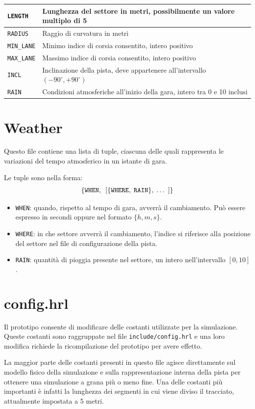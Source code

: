 \documentclass[11pt,a4paper]{report}
\begin{document}
\begin{tabularx}{\textwidth}{|l|X|}
\hline
\texttt{LENGTH} & Lunghezza del settore in metri, possibilmente un valore multiplo di 5\\
\hline
\texttt{RADIUS} & Raggio di curvatura in metri\\
\hline
\texttt{MIN\_LANE} & Minimo indice di corsia consentito, intero positivo\\
\hline
\texttt{MAX\_LANE} & Massimo indice di corsia consentito, intero positivo\\
\hline
\texttt{INCL} & Inclinazione della pista, deve appartenere all'intervallo $(-90^\circ, +90^\circ)$\\
\hline
\texttt{RAIN} & Condizioni atmosferiche all'inizio della gara, intero tra 0 e 10 inclusi\\
\hline
\end{tabularx}

\section*{Weather}
Questo file contiene una lista di tuple, ciascuna delle quali rappresenta le variazioni del tempo atmosferico in un istante di gara.

Le tuple sono nella forma:
\[ \{\mbox{\texttt{WHEN}},\;\: [\{\mbox{\texttt{WHERE}},\; \mbox{\texttt{RAIN}}\},\; \ldots\;\: ]\} \]
\begin{itemize}
\item \texttt{WHEN}: quando, rispetto al tempo di gara, avverrà il cambiamento. Può essere espresso in secondi oppure nel formato $\{h,m,s\}$.
\item \texttt{WHERE}: in che settore avverrà il cambiamento, l'indice si riferisce alla posizione del settore nel file di configurazione della pista.
\item \texttt{RAIN}: quantità di pioggia presente nel settore, un intero nell'intervallo $[0, 10]$.
\end{itemize}

\section*{config.hrl}
Il prototipo consente di modificare delle costanti utilizzate per la simulazione.
Queste costanti sono raggruppate nel file \texttt{include/config.hrl} e una loro modifica richiede la ricompilazione del prototipo per avere effetto.

La maggior parte delle costanti presenti in questo file agisce direttamente sul modello fisico della simulazione e sulla rappresentazione interna della pista per ottenere una simulazione a grana più o meno fine. Una delle costanti più importanti è infatti la lunghezza dei segmenti in cui viene diviso il tracciato, attualmente impostata a 5 metri.
\end{document}
